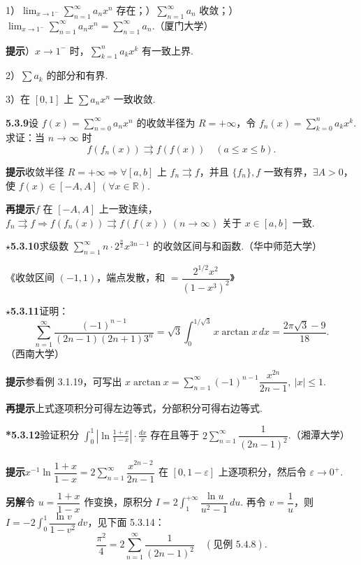 \documentclass[UTF8, 12pt, fontset=fandol, oneside]{ctexart}
\begin{document}
1）$\displaystyle\lim_{x\to1^-}\sum_{n=1}^{\infty}a_nx^n$ 存在；）$\displaystyle\sum_{n=1}^{\infty}a_n$ 收敛；）$\displaystyle\lim_{x\to1^-}\sum_{n=1}^{\infty}a_nx^n=\sum_{n=1}^{\infty}a_n$.（厦门大学）

\noindent\textbf{提示}）$x\to1^-$ 时，$\displaystyle\sum_{k=1}^n a_kx^k$ 有一致上界.

2）$\displaystyle\sum a_k$ 的部分和有界.

3）在 $[0,1]$ 上 $\displaystyle\sum a_nx^n$ 一致收敛.

\noindent\textbf{5.3.9}\quad 设 $f(x)=\displaystyle\sum_{n=0}^{\infty}a_nx^n$ 的收敛半径为 $R=+\infty$，令 $f_n(x)=\displaystyle\sum_{k=0}^n a_kx^k$. 求证：当 $n\to\infty$ 时
\[
  f(f_n(x))\rightrightarrows f(f(x))\quad(a\le x\le b).
\]

\noindent\textbf{提示}\quad 收敛半径 $R=+\infty\Rightarrow\forall[a,b]$ 上 $f_n\rightrightarrows f$，并且 $\{f_n\},f$ 一致有界，$\exists A>0$，使 $f(x)\in[-A,A]\ (\forall x\in\mathbb R)$.

\noindent\textbf{再提示}\quad $f$ 在 $[-A,A]$ 上一致连续，$f_n\rightrightarrows f\Longrightarrow f(f_n(x))\rightrightarrows f(f(x))\ (n\to\infty)$ 关于 $x\in[a,b]$ 一致.

\noindent\textbf{\(\star\)5.3.10}\quad 求级数 $\displaystyle\sum_{n=1}^{\infty}n\cdot2^{\frac n2}x^{3n-1}$ 的收敛区间与和函数.（华中师范大学）

\hfill 《收敛区间 $(-1,1)$，端点发散，和 $=\dfrac{2^{1/2}x^2}{(1-x^3)^2}$》

\noindent\textbf{\(\star\)5.3.11}\quad 证明：
\[
  \sum_{n=1}^{\infty}\frac{(-1)^{n-1}}{(2n-1)(2n+1)3^n}
  =\sqrt3\int_0^{1/\sqrt3}x\arctan x\,dx
  =\frac{2\pi\sqrt3-9}{18}.
\]
（西南大学）

\noindent\textbf{提示}\quad 参看例 3.1.19，可写出 $x\arctan x=\displaystyle\sum_{n=1}^{\infty}(-1)^{n-1}\dfrac{x^{2n}}{2n-1},\ |x|\le1$.

\noindent\textbf{再提示}\quad 上式逐项积分可得左边等式，分部积分可得右边等式.

\noindent\textbf{*5.3.12}\quad 验证积分 $\displaystyle\int_0^1\left|\ln\frac{1+x}{1-x}\right|\cdot\frac{dx}{x}$ 存在且等于 $2\displaystyle\sum_{n=1}^{\infty}\dfrac1{(2n-1)^2}$.（湘潭大学）

\noindent\textbf{提示}\quad $x^{-1}\ln\dfrac{1+x}{1-x}=2\displaystyle\sum_{n=1}^{\infty}\dfrac{x^{2n-2}}{2n-1}$ 在 $[0,1-\varepsilon]$ 上逐项积分，然后令 $\varepsilon\to0^+$.

\noindent\textbf{另解}\quad 令 $u=\dfrac{1+x}{1-x}$ 作变换，原积分 $I=2\displaystyle\int_1^{+\infty}\dfrac{\ln u}{u^2-1}\,du$. 再令 $v=\dfrac1u$，则 $I=-2\displaystyle\int_0^1\dfrac{\ln v}{1-v^2}\,dv$，见下面 5.3.14：
\[
  \frac{\pi^2}{4}=2\sum_{n=1}^{\infty}\frac1{(2n-1)^2}\quad(\text{见例 5.4.8}).
\]
\end{document}
